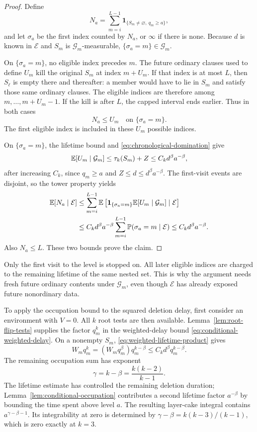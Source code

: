 \begin{proof}
Define
\[
 N_a=\sum_{m=i}^{L-1}
       \mathbf1_{\{S_m\ne\varnothing,\ q_m\ge a\}},
\]
and let \(\sigma_a\) be the first index counted by \(N_a\), or
\(\infty\) if there is none.  Because \(d\)
is known in \(\mathcal E\) and \(S_m\) is \(\mathcal G_m\)-measurable,
\(\{\sigma_a=m\}\in\mathcal G_m\).

On \(\{\sigma_a=m\}\), no eligible index precedes \(m\).  The future
ordinary clauses used to define \(U_m\) kill the original \(S_m\)
at index \(m+U_m\).  If that index is at most \(L\), then \(S_\ell\)
is empty there and thereafter: a member would have to lie in \(S_m\)
and satisfy those same ordinary clauses.  The eligible indices are
therefore among \(m,\ldots,m+U_m-1\).  If the kill is after \(L\),
the capped interval ends earlier.  Thus in both cases
\[
 N_a\le U_m\quad\text{on }\{\sigma_a=m\}.
\]
The first eligible index is included in these \(U_m\) possible indices.

On \(\{\sigma_a=m\}\), the lifetime bound and
\eqref{eq:chronological-domination} give
\[
 \mathbb E[U_m\mid\mathcal G_m]
 \le\tau_k(S_m)+Z
 \le C_kd^\beta a^{-\beta},
\]
after increasing \(C_k\), since \(q_m\ge a\) and
\(Z\le d\le d^\beta a^{-\beta}\).  The first-visit events are disjoint,
so the tower property yields
\begin{align*}
 \mathbb E[N_a\mid\mathcal E]
 &\le\sum_{m=i}^{L-1}
   \mathbb E\left[\mathbf1_{\{\sigma_a=m\}}
                \mathbb E[U_m\mid\mathcal G_m]\mid\mathcal E\right]\\
 &\le C_kd^\beta a^{-\beta}
       \sum_{m=i}^{L-1}\mathbb P(\sigma_a=m\mid\mathcal E)
 \le C_kd^\beta a^{-\beta}.
\end{align*}
Also \(N_a\le L\).  These two bounds prove the claim.
\end{proof}

Only the first visit to the level is stopped on.  All later eligible
indices are charged to the remaining lifetime of the same nested
set.  This is why the argument needs fresh future ordinary contents
under \(\mathcal G_m\), even though \(\mathcal E\) has already exposed
future nonordinary data.

To apply the occupation bound to the squared deletion delay, first
consider an environment with \(V=0\).  All \(k\) root tests are then
available.  Lemma~\ref{lem:root-flip-tests} supplies the factor
\(q_m^k\) in the weighted-delay bound
\eqref{eq:conditional-weighted-delay}.  On a nonempty \(S_m\),
\eqref{eq:weighted-lifetime-product} gives
\[
 W_mq_m^k=(W_mq_m^\beta)q_m^{k-\beta}
 \le C_kd^\beta q_m^{k-\beta}.
\]
The remaining occupation sum has exponent
\[
 \gamma=k-\beta=\frac{k(k-2)}{k-1}.
\]
The lifetime estimate has controlled the remaining deletion duration;
Lemma~\ref{lem:conditional-occupation} contributes a second lifetime
factor \(a^{-\beta}\) by bounding the time spent above level \(a\).
The resulting layer-cake integral contains \(a^{\gamma-\beta-1}\).
Its integrability at zero is determined by
\(\gamma-\beta=k(k-3)/(k-1)\), which is zero exactly at \(k=3\).

